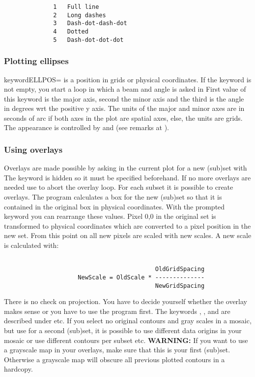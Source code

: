 \begin{verbatim}
              1   Full line
              2   Long dashes
              3   Dash-dot-dash-dot
              4   Dotted
              5   Dash-dot-dot-dot
\end{verbatim}              
             
\subsubsection*{Plotting ellipses}
              
keyword{ELLPOS=} is a position in grids or physical coordinates. 
If the keyword is not empty, you start a loop in which 
a beam and angle is asked in  First value of
this keyword is the major axis, second the minor axis
and the third is the angle in degrees wrt the positive
y axis. The units of the major and minor axes are in
seconds of arc if both axes in the plot are spatial
axes, else, the units are grids. The appearance is 
controlled by  and (see remarks at ).

              
\subsubsection*{Using overlays}
              
Overlays are made possible by asking in the current plot
for a new (sub)set with  The keyword is hidden so
it must be specified beforehand. If no more overlays are
needed use  to abort the overlay loop. For each
subset it is possible to create overlays. The program 
calculates a box for the new (sub)set so that it is 
contained in the original box in physical coordinates. 
With the prompted keyword  you can rearrange these 
values. Pixel 0,0 in the original set is transformed to
physical coordinates which are converted to a pixel position 
in the new set.
From this point on all new pixels are scaled with new
scales. A new scale is calculated with:

\begin{verbatim}
              
                                           OldGridSpacing
                     NewScale = OldScale * --------------
                                           NewGridSpacing 
\end{verbatim}             
              
There is no check on projection. You have to decide
yourself whether the overlay makes sense or you have to
use the program  first. The keywords ,
, and  are described under
 etc.
If you select no original contours and gray scales in a
mosaic, but use  for a second (sub)set, it is
possible to use different data origins in your mosaic or
use different contours per subset etc. \newline
{\bf WARNING:} If you want to use a grayscale map in your overlays, 
make sure that this is your first (sub)set. Otherwise a 
grayscale map will obscure all previous plotted contours 
in a hardcopy.


